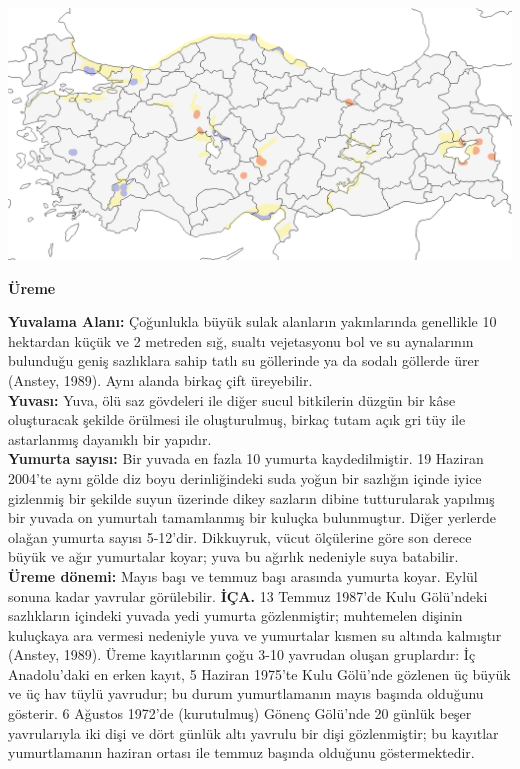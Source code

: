\documentclass[
  a4paper,
  DIV=11,
  numbers=noendperiod]{scrartcl}
\begin{document}
\includegraphics{images/harita_Oxyura leucocephala.png}

\textbf{Üreme}

\textbf{Yuvalama Alanı:} Çoğunlukla büyük sulak alanların yakınlarında
genellikle 10 hektardan küçük ve 2 metreden sığ, sualtı vejetasyonu bol
ve su aynalarının bulunduğu geniş sazlıklara sahip tatlı su göllerinde
ya da sodalı göllerde ürer (Anstey, 1989). Aynı alanda birkaç çift
üreyebilir.\\
\textbf{Yuvası:} Yuva, ölü saz gövdeleri ile diğer sucul bitkilerin
düzgün bir kâse oluşturacak şekilde örülmesi ile oluşturulmuş, birkaç
tutam açık gri tüy ile astarlanmış dayanıklı bir yapıdır.\\
\textbf{Yumurta sayısı:} Bir yuvada en fazla 10 yumurta kaydedilmiştir.
19 Haziran 2004'te aynı gölde diz boyu derinliğindeki suda yoğun bir
sazlığın içinde iyice gizlenmiş bir şekilde suyun üzerinde dikey
sazların dibine tutturularak yapılmış bir yuvada on yumurtalı
tamamlanmış bir kuluçka bulunmuştur. Diğer yerlerde olağan yumurta
sayısı 5-12'dir. Dikkuyruk, vücut ölçülerine göre son derece büyük ve
ağır yumurtalar koyar; yuva bu ağırlık nedeniyle suya batabilir.\\
\textbf{Üreme dönemi:} Mayıs başı ve temmuz başı arasında yumurta koyar.
Eylül sonuna kadar yavrular görülebilir. \textbf{İÇA.} 13 Temmuz 1987'de
Kulu Gölü'ndeki sazlıkların içindeki yuvada yedi yumurta gözlenmiştir;
muhtemelen dişinin kuluçkaya ara vermesi nedeniyle yuva ve yumurtalar
kısmen su altında kalmıştır (Anstey, 1989). Üreme kayıtlarının çoğu 3-10
yavrudan oluşan gruplardır: İç Anadolu'daki en erken kayıt, 5 Haziran
1975'te Kulu Gölü'nde gözlenen üç büyük ve üç hav tüylü yavrudur; bu
durum yumurtlamanın mayıs başında olduğunu gösterir. 6 Ağustos 1972'de
(kurutulmuş) Gönenç Gölü'nde 20 günlük beşer yavrularıyla iki dişi ve
dört günlük altı yavrulu bir dişi gözlenmiştir; bu kayıtlar
yumurtlamanın haziran ortası ile temmuz başında olduğunu göstermektedir.
\end{document}
